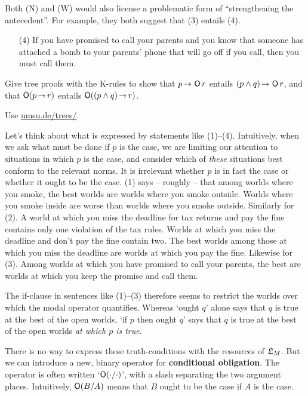 Both (N) and (W) would also license a problematic form of ``strengthening the
antecedent''. For example, they both suggest that (3) entails (4).
\begin{itemize}[leftmargin=10mm]
\itemsep-1mm
\item[(4)] If you have promised to call your parents and you know that someone
  has attached a bomb to your parents' phone that will go off if you call, then
  you must call them.
\end{itemize}

\begin{exercise}
  Give tree proofs with the K-rules to show that $p \to \Ob r$ entails
  $(p \land q) \to \Ob r$, and that $\Ob (p \to r)$ entails
  $\Ob((p \land q) \to r)$.
\end{exercise}
\begin{solution}
  Use \href{https://www.umsu.de/trees/}{umsu.de/trees/}.
\end{solution}

Let's think about what is expressed by statements like (1)--(4). Intuitively,
when we ask what must be done if $p$ is the case, we are limiting our attention
to situations in which $p$ is the case, and consider which of \emph{these}
situations best conform to the relevant norms. It is irrelevant whether $p$ is
in fact the case or whether it ought to be the case. (1) says -- roughly -- that
among worlds where you smoke, the best worlds are worlds where you smoke
outside. Worlds where you smoke inside are worse than worlds where you smoke
outside. Similarly for (2). A world at which you miss the deadline for tax
returns and pay the fine contains only one violation of the tax rules. Worlds at
which you miss the deadline and don't pay the fine contain two. The best
worlds among those at which you miss the deadline are worlds at which you pay
the fine. Likewise for (3). Among worlds at which you have promised to call your
parents, the best are worlds at which you keep the promise and call them.

The if-clause in sentences like (1)--(3) therefore seems to restrict the worlds
over which the modal operator quantifies. Whereas `ought $q$' alone says that
$q$ is true at the best of the open worlds, `if $p$ then ought $q$' says that
$q$ is true at the best of the open worlds \emph{at which $p$ is true}.

There is no way to express these truth-conditions with the resources of $\mathfrak{L}_M$.
But we can introduce a new, binary operator for \textbf{conditional obligation}.
The operator is often written `$\operatorname{\mathsf{O}}(\cdot/\cdot)$', with a slash separating the
two argument places. Intuitively, $\operatorname{\mathsf{O}}(B/A)$ means that $B$ ought to be the
case if $A$ is the case.

